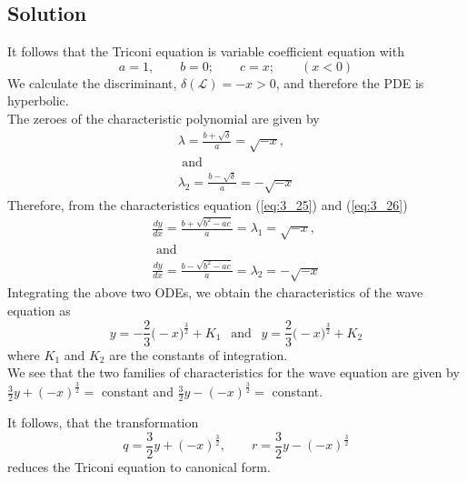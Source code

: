 \documentclass[11pt]{report}
\newcommand{\Laplace}{\mathcal{L}}
\newcommand{\NI}{\noindent}
\newcommand{\sps}{\\[0.2cm]}
\newcommand{\refn}[1]{(\ref{#1})}
\newcommand{\refx}[1]{\refn{eq:#1}}
\newcommand{\dsp}{\displaystyle}
\begin{document}
	\subsection*{Solution}
	It follows that the Triconi equation is variable coefficient equation with
	\begin{equation}
		a=1,\qquad b=0;\qquad c=x;\qquad (x<0)\label{ex:3_3_2} \tag{2}
	\end{equation}
	We calculate the discriminant, $\delta(\Laplace) = -x > 0$, and therefore the PDE is hyperbolic.\sps
	The zeroes of the characteristic polynomial are given by
	\begin{equation}
		\begin{array}{l}
			\dsp\lambda = \frac{b+\sqrt{\delta}}{a} = \sqrt{-x},\\
			\text{ and }\\
			\dsp\lambda_2= \frac{b-\sqrt{\delta}}{a}= -\sqrt{-x}
		\end{array}\label{ex:3_3_3} \tag{3}
	\end{equation}
	Therefore, from the characteristics equation \refx{3_25} and \refx{3_26}
	\begin{equation}
	\begin{array}{l}
			\dsp\frac{dy}{dx} = \frac{b+\sqrt{b^2-ac}}{a} = \lambda_1 = \sqrt{-x},\\
			\text{ and }\\
			\dsp\frac{dy}{dx}= \frac{b-\sqrt{b^2-ac}}{a}=\lambda_2 = -\sqrt{-x}
	\end{array}\label{ex:3_3_4} \tag{4}
	\end{equation}
	Integrating the above two ODEs, we obtain the characteristics of the wave equation as
	\begin{equation}
		y=-\frac{2}{3}\Big(-x\Big)^{\frac{3}{2}} + K_1 ~~\text{ and }~~ y =\frac{2}{3}\Big(-x\Big)^{\frac{3}{2}} + K_2 \label{ex:3_3_5} \tag{5}
	\end{equation}
	where $K_1$ and $K_2$ are the constants of integration.\\
	
	\NI We see that the two families of characteristics for the wave equation are given by $\dsp \frac{3}{2}y+(-x)^{\frac{3}{2}}=$ constant and $\dsp \frac{3}{2}y-(-x)^{\frac{3}{2}}=$ constant.
	
	\NI It follows, that the transformation
	\begin{equation}
		q = \frac{3}{2}y+(-x)^{\frac{3}{2}}, \qquad  r=\frac{3}{2}y-(-x)^{\frac{3}{2}}\label{ex:3_3_6} \tag{6}
	\end{equation}
	reduces the Triconi equation to canonical form.
	
\end{document}
